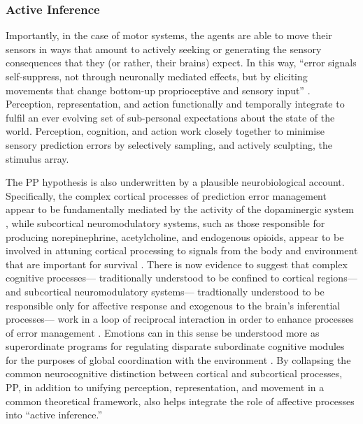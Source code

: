 \begin{mccorrection}
\subsubsection{Active Inference}
Importantly, in the case of motor systems, the agents are able to move their sensors in ways that amount to actively seeking or generating the sensory consequences that they (or rather, their brains) expect.  In this way, ``error signals self-suppress, not through neuronally mediated effects, but by eliciting movements that change bottom-up proprioceptive and sensory input'' \citep[186]{Clark2013}. Perception, representation, and action functionally and temporally integrate to fulfil an ever evolving set of sub-personal expectations about the state of the world.  Perception, cognition, and action work closely together to minimise sensory prediction errors by selectively sampling, and actively sculpting, the stimulus array.

The PP hypothesis is also underwritten by a plausible neurobiological account. Specifically, the complex cortical processes of prediction error management appear to be fundamentally mediated by the activity of the dopaminergic system \citep{Schultz2016}, while subcortical neuromodulatory systems, such as those responsible for producing norepinephrine, acetylcholine, and endogenous opioids, appear to be involved in attuning cortical processing to signals from the body and environment that are important for survival \citep{Lewis2005}.  There is now evidence to suggest that complex cognitive processes--- traditionally understood to be confined to cortical regions--- and subcortical neuromodulatory systems--- tradtionally understood to be responsible only for affective response and exogenous to the brain's inferential processes--- work in a loop of reciprocal interaction in order to enhance processes of error management \citep{Damasio1994,Lewis2005,Miller2017,Barrett2017}.
Emotions can in this sense be understood more as superordinate programs for regulating disparate subordinate cognitive modules for the purposes of global coordination with the environment \citep{Cosmides2000}.  By collapsing the common neurocognitive distinction between cortical and subcortical processes, PP, in addition to unifying perception, representation, and movement in a common theoretical framework, also helps integrate the role of affective processes into ``active inference.''


\end{mccorrection}
